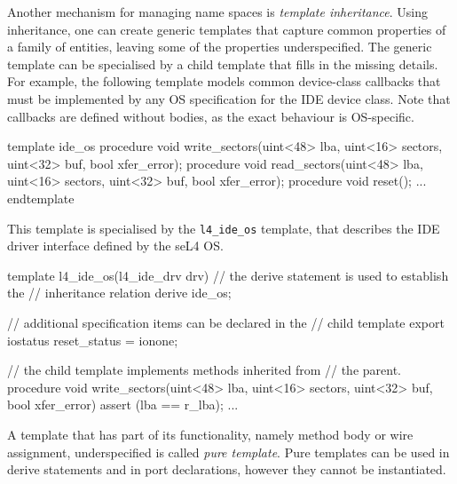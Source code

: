 \documentclass{report}
\newcommand{\src}[1]{\texttt{#1}}
\begin{document}
Another mechanism for managing name spaces is \emph{template 
inheritance}.  Using inheritance, one can create generic templates 
that capture common properties of a family of entities, leaving 
some of the properties underspecified.  The generic template can 
be specialised by a child template that fills in the missing 
details.  For example, the following template models common 
device-class callbacks that must be implemented by any OS 
specification for the IDE device class.  Note that callbacks are 
defined without bodies, as the exact behaviour is OS-specific.
\begin{tsllisting}{}
template ide_os
  procedure void write_sectors(uint<48> lba, 
    uint<16> sectors, uint<32> buf, bool xfer_error);
  procedure void read_sectors(uint<48> lba, 
    uint<16> sectors, uint<32> buf, bool xfer_error);
  procedure void reset();
  ...
endtemplate
\end{tsllisting}
This template is specialised by the \src{l4\_ide\_os} template,
that describes the IDE driver interface defined by the seL4 OS.
\begin{tsllisting}{}
template l4_ide_os(l4_ide_drv drv)
  // the derive statement is used to establish the 
  // inheritance relation
  derive ide_os;

  // additional specification items can be declared in the 
  // child template
  export iostatus reset_status = ionone;

  // the child template implements methods inherited from 
  // the parent.
  procedure void write_sectors(uint<48> lba, 
    uint<16> sectors, uint<32> buf, bool xfer_error)
  {
    assert (lba == r_lba);
    ...
  }
\end{tsllisting}

A template that has part of its functionality, namely method body 
or wire assignment, underspecified is called \emph{pure template}.  
Pure templates can be used in derive statements and in port 
declarations, however they cannot be instantiated.
\end{document}
